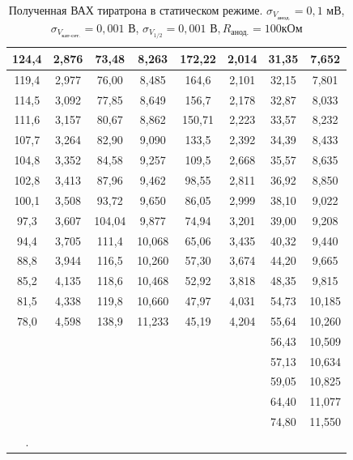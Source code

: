 \documentclass[a4paper, 12pt]{article}%
\begin{document}
\begin{enumerate}
\begin{longtable}{|c|c|c|c|c|c|c|c|}
		124,4 & 2,876 & 73,48 & 8,263 & 172,22 & 2,014 & 31,35 & 7,652 \\ \hline
		119,4 & 2,977 & 76,00 & 8,485 & 164,6  & 2,101 & 32,15 & 7,801 \\ \hline
		114,5 & 3,092 & 77,85 & 8,649 & 156,7  & 2,178 & 32,87 & 8,033 \\ \hline
		111,6 & 3,157 & 80,67 & 8,862 & 150,71 & 2,223 & 33,57 & 8,232 \\ \hline
		107,7 & 3,264 & 82,90 & 9,090 & 133,5  & 2,392 & 34,39 & 8,433 \\ \hline
		104,8 & 3,352 & 84,58 & 9,257 & 109,5  & 2,668 & 35,57 & 8,635 \\ \hline
		102,8 & 3,413 & 87,96 & 9,462 & 98,55  & 2,811 & 36,92 & 8,850 \\ \hline
		100,1 & 3,508 & 93,72 & 9,650 & 86,05  & 2,999 & 38,10 & 9,022 \\ \hline
		97,3 &  3,607 & 104,04& 9,877 & 74,94  & 3,201 & 39,00 & 9,208 \\ \hline
		94,4 &  3,705 & 111,4 & 10,068& 65,06  & 3,435 & 40,32 & 9,440 \\ \hline
		88,8 &  3,944 & 116,5 & 10,260& 57,30  & 3,674 & 44,20 & 9,665 \\ \hline
		85,2 &  4,135 & 118,6 & 10,468& 52,92  & 3,818 & 48,35 & 9,815 \\ \hline
		81,5 &  4,338 & 119,8 & 10,660& 47,97  & 4,031 & 54,73 & 10,185\\ \hline
		78,0 &  4,598 & 138,9 & 11,233& 45,19  & 4,204 & 55,64 & 10,260\\ \hline
		
		     &        &       &       &        &       & 56,43 & 10,509\\ \hline
       		 &        &       &       &        &       & 57,13 & 10,634\\ \hline
   		     &        &       &       &        &       & 59,05 & 10,825\\ \hline
	         &        &       &       &        &       & 64,40 & 11,077\\ \hline
             &        &       &       &        &       & 74,80 & 11,550\\ \hline
		\caption{Полученная ВАХ тиратрона в статическом режиме. $\sigma_{V_{\text{анод.}}} = 0,1 $ мВ, $\sigma_{V_{\text{кат-сет.}}} = 0,001 $ В, $\sigma_{V_{1/2}} = 0,001 $ В$, R_{\text{анод.}} = 100 $кОм}. 
	\end{longtable}



\end{enumerate}
\end{document}

